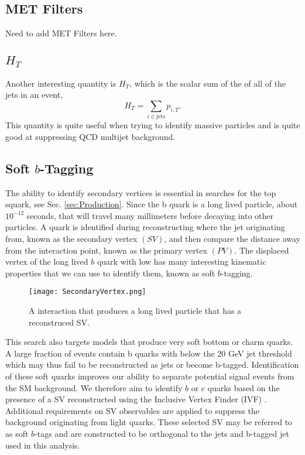 \subsection{MET Filters}
Need to add MET Filters here.

\subsection{$H_T$}\label{HT}
Another interesting quantity is $H_T$, which is the scalar sum of the \pt{} of all of the jets in an event,
\begin{equation}
H_T=\sum_{i\in\text{jets}}p_{i,T}.
\end{equation}
This quantity is quite useful when trying to identify massive particles and is quite good at suppressing QCD multijet background.

\subsection{Soft $b$-Tagging}\label{SV}

The ability to identify secondary vertices is essential in searches for the top squark, see Sec. \ref{sec:Production}. Since the b quark is a long lived particle, about $10^{-12}$ seconds, that will travel many millimeters before decaying into other particles. A \B{} quark is identified during reconstructing where the jet originating from, known as the secondary vertex $(SV)$, and then compare the distance away from the interaction point, known as the primary vertex $(PV)$. The displaced vertex of the long lived $b$ quark with low \pt{} has many interesting kinematic properties that we can use to identify them, known as soft $b$-tagging. 

\begin{figure}
 	\centering
	\texttt{[image: SecondaryVertex.png]}
 	\caption[Secondary Vertex Diagram]{A interaction that produces a long lived particle that has a reconstruced SV.}
 	\label{SecondaryVertex} 
\end{figure}

This search also targets models that produce very soft bottom or charm quarks. A large fraction of events contain b quarks with \pt{} below the 20 GeV jet \pt{} threshold which may thus fail to be reconstructed as jets or become b-tagged. Identification of these soft quarks improves our ability to separate potential signal events from the SM background. We therefore aim to identify $b$ or $c$ quarks based on the presence of a SV reconstructed using the Inclusive Vertex Finder (IVF) \cite{noauthor_inclusivesecondaryvertexfinder_nodate}. Additional requirements on SV observables are applied to suppress the background originating from light quarks. These selected SV may be referred to as soft $b$-tags and are constructed to be orthogonal to the jets and b-tagged jet used in this analysis. 

